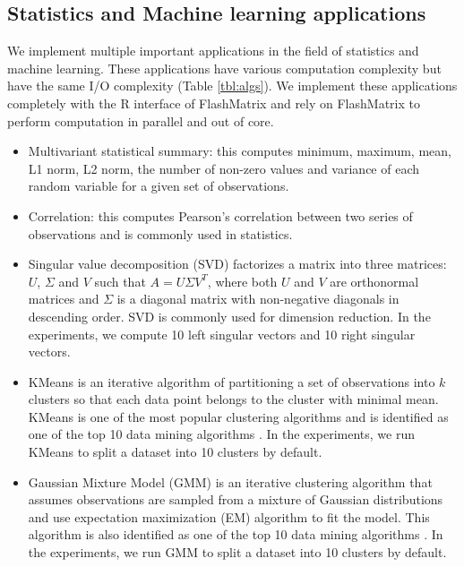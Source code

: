 \subsection{Statistics and Machine learning applications} \label{sec:apps}
We implement multiple important applications in the field of statistics and
machine learning. These applications have various computation complexity but
have the same I/O complexity (Table \ref{tbl:algs}). We implement these
applications completely with the R interface of FlashMatrix and
rely on FlashMatrix to perform computation in parallel and out of core.
\begin{itemize}
	\item Multivariant statistical summary: this computes minimum, maximum,
		mean, L1 norm, L2 norm, the number of non-zero values and variance
		of each random variable for a given set of observations.
	\item Correlation: this computes Pearson's correlation \cite{} between
		two series of observations and is commonly used in statistics.
	\item Singular value decomposition (SVD) factorizes a matrix into
		three matrices: $U$, $\Sigma$ and $V$ such that $A=U \Sigma V^T$, where
		both $U$ and $V$ are orthonormal matrices and $\Sigma$ is a diagonal
		matrix with non-negative diagonals in descending order. SVD is commonly
		used for dimension reduction. In the experiments, we compute 10 left
		singular vectors and 10 right singular vectors.
	\item KMeans \cite{kmeans} is an iterative algorithm of partitioning a set
		of observations into $k$ clusters
		so that each data point belongs to the cluster with minimal mean. KMeans
		is one of the most popular clustering algorithms and is identified as
		one of the top 10 data mining algorithms \cite{top10}. In the experiments,
		we run KMeans to split a dataset into 10 clusters by default.
	\item Gaussian Mixture Model (GMM) \cite{gmm} is an iterative clustering
		algorithm that assumes observations are sampled from a mixture of
		Gaussian distributions and use expectation maximization (EM) \cite{gmm}
		algorithm to fit the model. This algorithm is also identified as one
		of the top 10 data mining algorithms \cite{top10}. In the experiments,
		we run GMM to split a dataset into 10 clusters by default.
\end{itemize}

